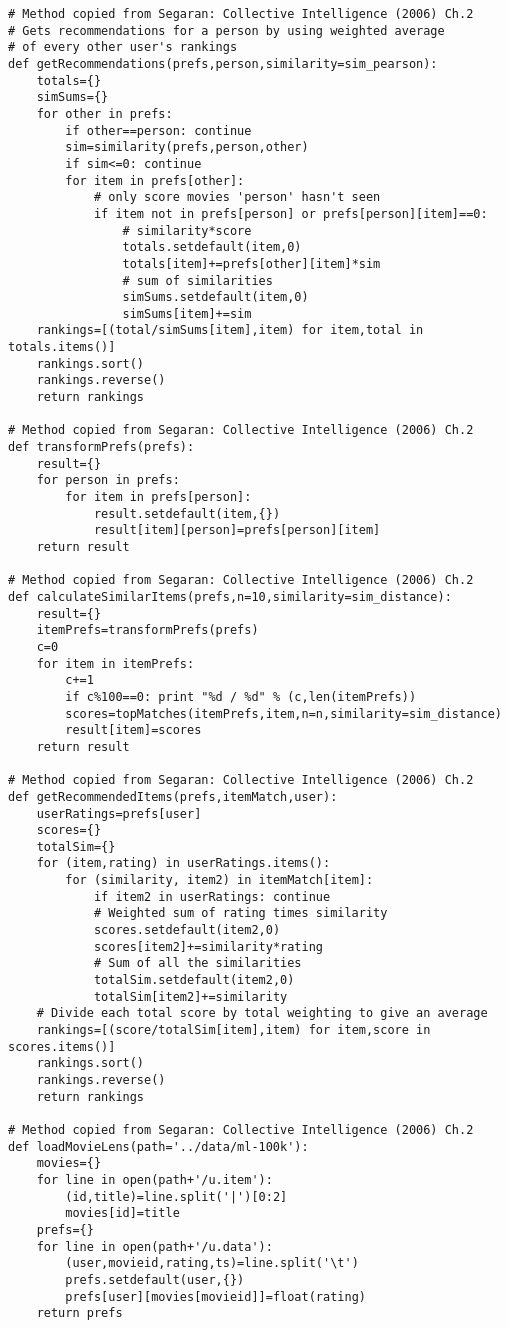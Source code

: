 \begin{verbatim}
# Method copied from Segaran: Collective Intelligence (2006) Ch.2
# Gets recommendations for a person by using weighted average
# of every other user's rankings
def getRecommendations(prefs,person,similarity=sim_pearson):
    totals={}
    simSums={}
    for other in prefs:
        if other==person: continue
        sim=similarity(prefs,person,other)
        if sim<=0: continue
        for item in prefs[other]:
            # only score movies 'person' hasn't seen
            if item not in prefs[person] or prefs[person][item]==0:
                # similarity*score
                totals.setdefault(item,0)
                totals[item]+=prefs[other][item]*sim
                # sum of similarities
                simSums.setdefault(item,0)
                simSums[item]+=sim
    rankings=[(total/simSums[item],item) for item,total in totals.items()]
    rankings.sort()
    rankings.reverse()
    return rankings

# Method copied from Segaran: Collective Intelligence (2006) Ch.2
def transformPrefs(prefs):
    result={}
    for person in prefs:
        for item in prefs[person]:
            result.setdefault(item,{})
            result[item][person]=prefs[person][item]
    return result

# Method copied from Segaran: Collective Intelligence (2006) Ch.2
def calculateSimilarItems(prefs,n=10,similarity=sim_distance):
    result={}
    itemPrefs=transformPrefs(prefs)
    c=0
    for item in itemPrefs:
        c+=1
        if c%100==0: print "%d / %d" % (c,len(itemPrefs))
        scores=topMatches(itemPrefs,item,n=n,similarity=sim_distance)
        result[item]=scores
    return result

# Method copied from Segaran: Collective Intelligence (2006) Ch.2
def getRecommendedItems(prefs,itemMatch,user):
    userRatings=prefs[user]
    scores={}
    totalSim={}
    for (item,rating) in userRatings.items():
        for (similarity, item2) in itemMatch[item]:
            if item2 in userRatings: continue
            # Weighted sum of rating times similarity
            scores.setdefault(item2,0)
            scores[item2]+=similarity*rating
            # Sum of all the similarities
            totalSim.setdefault(item2,0)
            totalSim[item2]+=similarity
    # Divide each total score by total weighting to give an average
    rankings=[(score/totalSim[item],item) for item,score in scores.items()]
    rankings.sort()
    rankings.reverse()
    return rankings

# Method copied from Segaran: Collective Intelligence (2006) Ch.2
def loadMovieLens(path='../data/ml-100k'):
    movies={}
    for line in open(path+'/u.item'):
        (id,title)=line.split('|')[0:2]
        movies[id]=title
    prefs={}
    for line in open(path+'/u.data'):
        (user,movieid,rating,ts)=line.split('\t')
        prefs.setdefault(user,{})
        prefs[user][movies[movieid]]=float(rating)
    return prefs


\end{verbatim}

